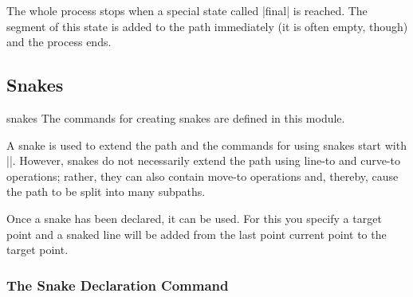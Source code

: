 The whole process stops when a special state called |final| is
reached. The segment of this state is added to the path immediately
(it is often empty, though) and the process ends.


\subsection{Snakes}

\label{section-base-snakes}

\begin{pgfmodule}{snakes}
  The commands for creating snakes are defined in this module.
\end{pgfmodule}

A snake is used to extend the path and the
commands for using snakes start with |\pgfpath|. However, snakes do
not necessarily extend the path using line-to and curve-to operations;
rather, they can also contain move-to operations and, thereby, cause
the path to be split into many subpaths.

Once a snake has been declared, it can be used. For this you specify a
target point and a snaked line will be added from the last point
current point to the target point.

\subsubsection{The Snake Declaration Command}

